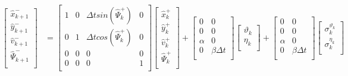 \documentclass[class=article, crop=false]{standalone}
\begin{document}
\begin{align*}
    \begin{bmatrix}
     \hat{x}_{k+1}^-    \\
     \hat{y}_{k+1}^-    \\
     \hat{v}_{k+1}^-    \\
     \hat{\Psi}_{k+1}^- \\
    \end{bmatrix} &=
    \begin{bmatrix}
     1 & 0 & \Delta t sin(\hat{\Psi}_{k}^+) & 0 \\
     0 & 1 & \Delta t cos(\hat{\Psi}_{k}^+) & 0 \\
     0 & 0 & 0                              & 0 \\
     0 & 0 & 0                              & 1 \\
    \end{bmatrix}
    \begin{bmatrix}
     \hat{x}_{k}^+    \\
     \hat{y}_{k}^+    \\
     \hat{v}_{k}^+    \\
     \hat{\Psi}_{k}^+ \\
    \end{bmatrix} +
    \begin{bmatrix}
     0      & 0             \\
     0      & 0             \\
     \alpha & 0             \\
     0      & \beta\Delta t \\
    \end{bmatrix}
    \begin{bmatrix}
     \vartheta_k \\
     \eta_k      \\
    \end{bmatrix} +
    \begin{bmatrix}
     0      & 0             \\
     0      & 0             \\
     \alpha & 0             \\
     0      & \beta\Delta t \\
    \end{bmatrix}
    \begin{bmatrix}
     \sigma^{\vartheta_k}_k \\
     \sigma^{\eta_k}_k      \\
    \end{bmatrix}\\

\end{align*}
\end{document}
